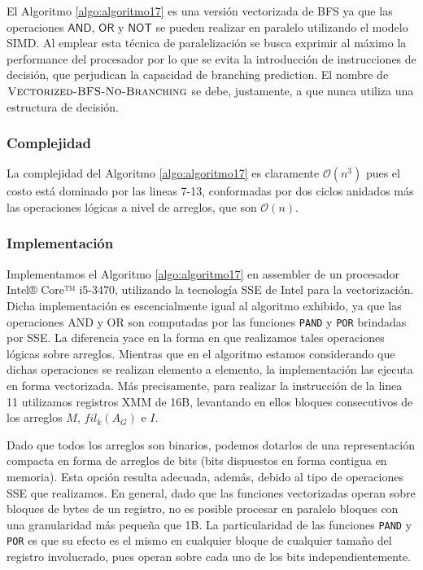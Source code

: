 El Algoritmo \ref{algo:algoritmo17} es una versión vectorizada de BFS ya que las operaciones $\textsf{AND}$, $\textsf{OR}$ y $\textsf{NOT}$ se pueden realizar en paralelo utilizando el modelo SIMD. Al emplear esta técnica de paralelización se busca exprimir al máximo la performance del procesador por lo que se evita la introducción de instrucciones de decisión, que perjudican la capacidad de branching prediction. El nombre de $\textsc{Vectorized-BFS-No-Branching}$ se debe, justamente, a que nunca utiliza una estructura de decisión.

\subsubsection{Complejidad}
La complejidad del Algoritmo \ref{algo:algoritmo17} es claramente $\mathcal{O}(n^3)$ pues el costo está dominado por las lineas 7-13, conformadas por dos ciclos anidados más las operaciones lógicas a nivel de arreglos, que son $\mathcal{O}(n)$.

\subsubsection{Implementación}
Implementamos el Algoritmo \ref{algo:algoritmo17} en assembler de un procesador Intel® Core™ i5-3470, utilizando la tecnología SSE de Intel para la vectorización. Dicha implementación es escencialmente igual al algoritmo exhibido, ya que las operaciones \textsf{AND} y \textsf{OR} son computadas por las funciones \texttt{PAND} y \texttt{POR} brindadas por SSE. La diferencia yace en la forma en que realizamos tales operaciones lógicas sobre arreglos. Mientras que en el algoritmo estamos considerando que dichas operaciones se realizan elemento a elemento, la implementación las ejecuta en forma vectorizada. Más precisamente, para realizar la instrucción de la linea 11 utilizamos registros XMM de 16B, levantando en ellos bloques consecutivos de los arreglos $M$, $fil_k(A_G)$ e $I$.

Dado que todos los arreglos son binarios, podemos dotarlos de una representación compacta en forma de arreglos de bits (bits dispuestos en forma contigua en memoria). Esta opción resulta adecuada, además, debido al tipo de operaciones SSE que realizamos. En general, dado que las funciones vectorizadas operan sobre bloques de bytes de un registro, no es posible procesar en paralelo bloques con una granularidad más pequeña que 1B. La particularidad de las funciones \texttt{PAND} y \texttt{POR} es que su efecto es el mismo en cualquier bloque de cualquier tamaño del registro involucrado, pues operan sobre cada uno de los bits independientemente.

